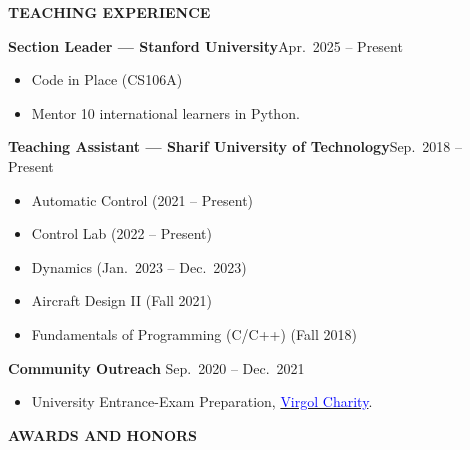 \documentclass[12pt]{article}
\begin{document}
\begin{center}
	{\noindent \bfseries TEACHING EXPERIENCE}
\end{center}
\vspace{-6pt}
\noindent\textbf{Section Leader — Stanford University}\hfill Apr.\ 2025 -- Present
\begin{itemize}
  \setlength\itemsep{-2pt}
  \vspace{-4pt}
  \item Code in Place (CS106A)
  \item Mentor 10 international learners in Python. %
\end{itemize}
\vspace{-4pt}
\noindent\textbf{Teaching Assistant — Sharif University of Technology}\hfill Sep.\ 2018 – Present
\begin{itemize}
  \setlength\itemsep{-2pt}       %
  \vspace{-4pt}
  \item Automatic Control (2021 – Present)
  \item Control Lab (2022 – Present)
  \item Dynamics (Jan.\ 2023 – Dec.\ 2023)
  \item Aircraft Design II (Fall 2021)
  \item Fundamentals of Programming (C/C++) (Fall 2018)
\end{itemize}
\vspace{-4pt}
\noindent\textbf{Community Outreach} \hfill Sep.\ 2020 -- Dec.\ 2021
\vspace{-6pt}
\begin{itemize}
  \setlength\itemsep{-2pt}
  \item University Entrance-Exam Preparation, %
  \href{https://www.instagram.com/virgool_charity?igsh=MWxsOGF3cTk1dzY3dw==}{\textcolor{blue}{Virgol Charity}}.%
\end{itemize}




\begin{center}
	{\noindent \bfseries AWARDS AND HONORS}
\end{center}




\end{document}
